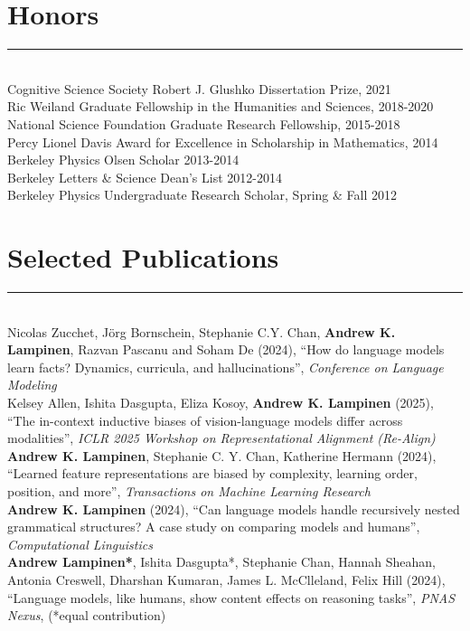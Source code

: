 \documentclass[margin]{res}
\begin{document}
\begin{resume}
\section{Honors} \vspace{-15pt} \rule{\textwidth}{0.5pt} \\[3pt]
Cognitive Science Society Robert J. Glushko Dissertation Prize, 2021 \\
Ric Weiland Graduate Fellowship in the Humanities and Sciences, 2018-2020 \\
National Science Foundation Graduate Research Fellowship, 2015-2018 \\
Percy Lionel Davis Award for Excellence in Scholarship in Mathematics, 2014 \\ 
Berkeley Physics Olsen Scholar 2013-2014 \\
Berkeley Letters \& Science Dean's List 2012-2014\\
Berkeley Physics Undergraduate Research Scholar, Spring \& Fall 2012
\vspace{1pt}\section{Selected Publications} \vspace{-15pt} \rule{\textwidth}{0.5pt} \\[3pt]
Nicolas Zucchet, J{\"o}rg Bornschein, Stephanie C.Y. Chan, \textbf{Andrew K. Lampinen}, Razvan Pascanu and Soham De (2024), {``How do language models learn facts? Dynamics, curricula, and hallucinations''}, \textit{Conference on Language Modeling}\\[3pt]
Kelsey Allen, Ishita Dasgupta, Eliza Kosoy, \textbf{Andrew K. Lampinen} (2025), {``The in-context inductive biases of vision-language models differ across modalities''}, \textit{ICLR 2025 Workshop on Representational Alignment (Re-Align)}\\[3pt]
\textbf{Andrew K. Lampinen}, Stephanie C. Y. Chan, Katherine Hermann (2024), {``Learned feature representations are biased by complexity, learning order, position, and more'',} \textit{Transactions on Machine Learning Research} \\[3pt]
\textbf{Andrew K. Lampinen} (2024), {``Can language models handle recursively nested grammatical structures? A case study on comparing models and humans'',} \textit{Computational Linguistics} \\[3pt]
\textbf{Andrew Lampinen*}, Ishita Dasgupta*, Stephanie Chan, Hannah Sheahan, Antonia Creswell, Dharshan Kumaran, James L. McClleland, Felix Hill (2024), {``Language models, like humans, show content effects on reasoning tasks'',} \textit{PNAS Nexus}, (*equal contribution) \\[3pt] 

\end{resume}
\end{document}

